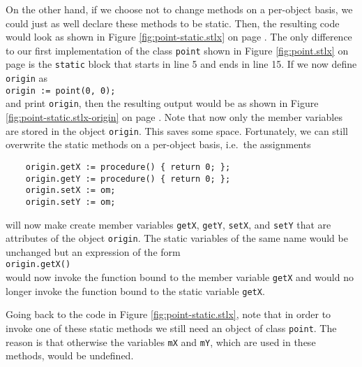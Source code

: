 On the other hand, if we choose not to change methods on a per-object basis, we could just as well
declare these methods to be static.  Then, the resulting code would look as shown in Figure
\ref{fig:point-static.stlx} on page \pageref{fig:point-static.stlx}.  The only difference to our
first implementation of the class \texttt{point} shown in Figure \ref{fig:point.stlx} on page
\pageref{fig:point.stlx} is the \texttt{static} block that starts in line 5 and ends in line 15.
If we now define \texttt{origin} as
\\[0.2cm]
\hspace*{1.3cm}
\texttt{origin := point(0, 0);}
\\[0.2cm]
and print \texttt{origin}, then the resulting output would be as shown in Figure
\ref{fig:point-static.stlx-origin} on page \pageref{fig:point-static.stlx-origin}.
Note that now only the member variables are stored in the object
\texttt{origin}.  This saves some space.  
Fortunately, we can still overwrite the static methods on a per-object
basis, i.e.~the assignments
\begin{verbatim}
    origin.getX := procedure() { return 0; };
    origin.getY := procedure() { return 0; };
    origin.setX := om;
    origin.setY := om;
\end{verbatim}
will now make create member variables \texttt{getX}, \texttt{getY}, \texttt{setX}, and \texttt{setY}
that are attributes of the object \texttt{origin}.  The static variables of the same name would be
unchanged but an expression of the form
\\[0.2cm]
\hspace*{1.3cm}
\texttt{origin.getX()}
\\[0.2cm]
would now invoke the function bound to the member variable \texttt{getX} and would no longer invoke
the function bound to the static variable \texttt{getX}.

Going back to the code in Figure \ref{fig:point-static.stlx}, note that in order to invoke one of these
static methods we still need an object of class \texttt{point}.  The reason is that otherwise the
variables \texttt{mX} and \texttt{mY}, which are used in these methods, would be undefined.

